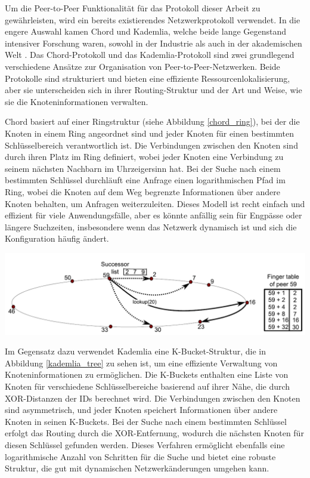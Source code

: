 Um die Peer-to-Peer Funktionalität für das Protokoll dieser Arbeit zu gewährleisten, wird ein bereits existierendes Netzwerkprotokoll verwendet. In die engere Auswahl kamen Chord und Kademlia, welche beide lange Gegenstand intensiver Forschung waren, sowohl in der Industrie als auch in der akademischen Welt \parencite[S. 808]{MedranoChavez_ChordKademliaHighChurnScenarios}. 
Das Chord-Protokoll und das Kademlia-Protokoll sind zwei grundlegend verschiedene Ansätze zur Organisation von Peer-to-Peer-Netzwerken. Beide Protokolle sind strukturiert und bieten eine effiziente Ressourcenlokalisierung, aber sie unterscheiden sich in ihrer Routing-Struktur und der Art und Weise, wie sie die Knoteninformationen verwalten.

Chord basiert auf einer Ringstruktur (siehe Abbildung \ref{chord_ring}), bei der die Knoten in einem Ring angeordnet sind und jeder Knoten für einen bestimmten Schlüsselbereich verantwortlich ist. Die Verbindungen zwischen den Knoten sind durch ihren Platz im Ring definiert, wobei jeder Knoten eine Verbindung zu seinem nächsten Nachbarn im Uhrzeigersinn hat. Bei der Suche nach einem bestimmten Schlüssel durchläuft eine Anfrage einen logarithmischen Pfad im Ring, wobei die Knoten auf dem Weg begrenzte Informationen über andere Knoten behalten, um Anfragen weiterzuleiten. Dieses Modell ist recht einfach und effizient für viele Anwendungsfälle, aber es könnte anfällig sein für Engpässe oder längere Suchzeiten, insbesondere wenn das Netzwerk dynamisch ist und sich die Konfiguration häufig ändert.

\begin{center}
    \captionsetup{type=figure}
    \includegraphics[width=0.9\linewidth]{images/chord_ring.png}
    \label{chord_ring}
\end{center}

\noindent Im Gegensatz dazu verwendet Kademlia eine K-Bucket-Struktur, die in Abbildung \ref{kademlia_tree} zu sehen ist, um eine effiziente Verwaltung von Knoteninformationen zu ermöglichen. Die K-Buckets enthalten eine Liste von Knoten für verschiedene Schlüsselbereiche basierend auf ihrer Nähe, die durch XOR-Distanzen der IDs berechnet wird. Die Verbindungen zwischen den Knoten sind asymmetrisch, und jeder Knoten speichert Informationen über andere Knoten in seinen K-Buckets. Bei der Suche nach einem bestimmten Schlüssel erfolgt das Routing durch die XOR-Entfernung, wodurch die nächsten Knoten für diesen Schlüssel gefunden werden. Dieses Verfahren ermöglicht ebenfalls eine logarithmische Anzahl von Schritten für die Suche und bietet eine robuste Struktur, die gut mit dynamischen Netzwerkänderungen umgehen kann.

